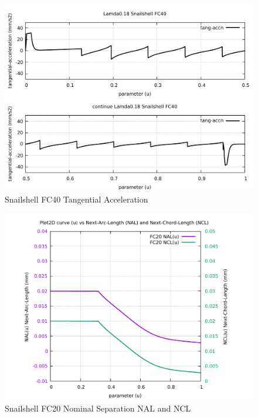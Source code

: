 \begin{figure}
	\caption     {Snailshell FC40 Tangential Acceleration}
	\label{24-img-Snailshell-FC40-Tangential-Acceleration.pdf}
	\includegraphics[width=1.00\textwidth]{Chap4/appendix/app-Snailshell/plots/24-img-Snailshell-FC40-Tangential-Acceleration.pdf}
\end{figure}

\clearpage
\pagebreak

\begin{figure}
	\caption     {Snailshell FC20 Nominal Separation NAL and NCL}
	\label{25-img-Snailshell-FC20-Nominal-Separation-NAL-and-NCL.pdf}
	\includegraphics[width=1.00\textwidth]{Chap4/appendix/app-Snailshell/plots/25-img-Snailshell-FC20-Nominal-Separation-NAL-and-NCL.pdf}
\end{figure}


